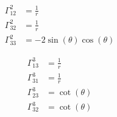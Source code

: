 \documentclass[12pt,letterpaper]{report}
\begin{document}
\hspace{0.5cm}
\begin{minipage}{0.3\linewidth}
    \begin{align*}
        \Gamma^2_{12}&= \frac{1}{r}\\
        \Gamma^2_{32}&= \frac{1}{r}\\
        \Gamma^2_{33}&=-2\sin(\theta)\cos(\theta)
    \end{align*}
\end{minipage}
\hspace{0.5cm}
\begin{minipage}{0.3\linewidth}
    \begin{align*}
        \Gamma^3_{13} &= \frac{1}{r}\\
        \Gamma^3_{31}&= \frac{1}{r}\\
         \Gamma^3_{23} &=\cot(\theta)\\
         \Gamma^3_{32} &=\cot(\theta)
    \end{align*}
\end{minipage}
\end{document}
